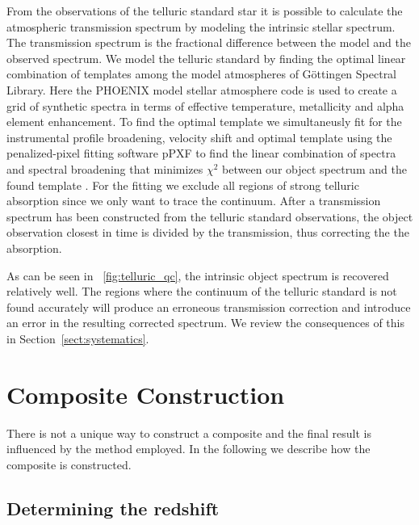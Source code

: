 \documentclass{aa}    %
\newcommand{\figref}[1]{\ref{fig:#1}}
\newcommand{\Fig}[1]{\figurename~\figref{#1}}
\newcommand{\fig}[1]{\Fig{#1}}
\newcommand{\sectionname}{Section}
\newcommand{\Sect}[1]{\sectionname~\ref{sect:#1}}
\newcommand{\sect}[1]{\Sect{#1}}
\newcommand{\sectlabel}[1]{\label{sect:#1}}
\begin{document}
From the observations of the telluric standard star it is possible to calculate the atmospheric transmission spectrum by modeling the intrinsic stellar spectrum. The transmission spectrum is the fractional difference between the model and the observed spectrum. We model the telluric standard by finding the optimal linear combination of templates among the model atmospheres of G\"ottingen Spectral Library\citep{Husser2013}. Here the PHOENIX model stellar atmosphere code is used to create a grid of synthetic spectra in terms of effective temperature, metallicity and alpha element enhancement. To find the optimal template we simultaneusly fit for the instrumental profile broadening, velocity shift and optimal template using the penalized-pixel fitting software pPXF\citep{Cappellari2004} to find the linear combination of spectra and spectral broadening that minimizes $\chi ^2$ between our object spectrum and the found template . For the fitting we exclude all regions of strong telluric absorption since we only want to trace the continuum. After a transmission spectrum has been constructed from the telluric standard observations, the object observation closest in time is divided by the transmission, thus correcting the the absorption. 

 As can be seen in \fig{telluric_qc}, the intrinsic object spectrum is recovered relatively well. The regions where the continuum of the telluric standard is not found accurately will produce an erroneous transmission correction and introduce an error in the resulting corrected spectrum. We review the consequences of this in \sect{systematics}. 



\section{Composite Construction}   \sectlabel{construct}

There is not a unique way to construct a composite and the final result is influenced by the method employed. In the following we describe how the composite is constructed.

\subsection{Determining the redshift}  \sectlabel{redshifts}
\end{document}

